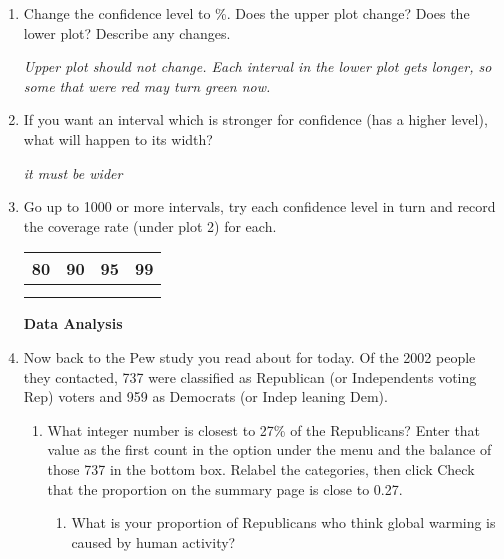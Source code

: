 \begin{enumerate}
\begin{key}
  {\it green, AWV about 90}
\end{key}

\item Change the confidence level to \%. Does the upper plot
  change?  Does the lower plot?  Describe any changes.
\begin{students}
  \vspace{1cm}
\end{students}
\begin{key}
  {\it Upper plot should not change. Each interval in the lower plot
    gets longer, so some that were red may turn green now.}
\end{key}


\item If you want an interval which is stronger for confidence
  (has a higher level), what will happen to its width?
\begin{students}
  \vspace{.6cm}
\end{students}
\begin{key}
  {\it it must be wider}
\end{key}

  \item Go up to 1000 or more intervals, try each confidence level in
    turn and record the coverage rate   (under plot 2) for each.\\
    \begin{tabular}{|r|r|r|r|} \hline
      {\Large 80} &  {\Large 90} &  {\Large 95} &  {\Large 99}\\ \hline
   {\large  \phantom{9000} } & {\Large \phantom{9000}  } &  {\Large
     \phantom{9000} } &  {\Large  \phantom{9000} } \\
       & & & \\ \hline
    \end{tabular}


    \begin{center}
      {\large\bf Data Analysis}
    \end{center}
  \item Now back to the Pew study you read about for today. Of the 2002 people
    they contacted, 737 were classified as Republican (or Independents
    voting Rep) voters and 959 as Democrats (or Indep leaning Dem).
    \begin{enumerate}
    \item What integer number is closest to 27\% of the Republicans?
      Enter that value as the first count  in the  option under the  menu   and the balance
      of those 737 in the bottom box. Relabel the
      categories, then click   Check that the
      proportion on the summary page is  close to 0.27. 
      \begin{enumerate}
      \item What is your proportion of Republicans who think global
        warming is caused by human activity?
\begin{students}
\vspace{.8cm}
\end{students}


\end{enumerate}
\end{enumerate}
\end{enumerate}
